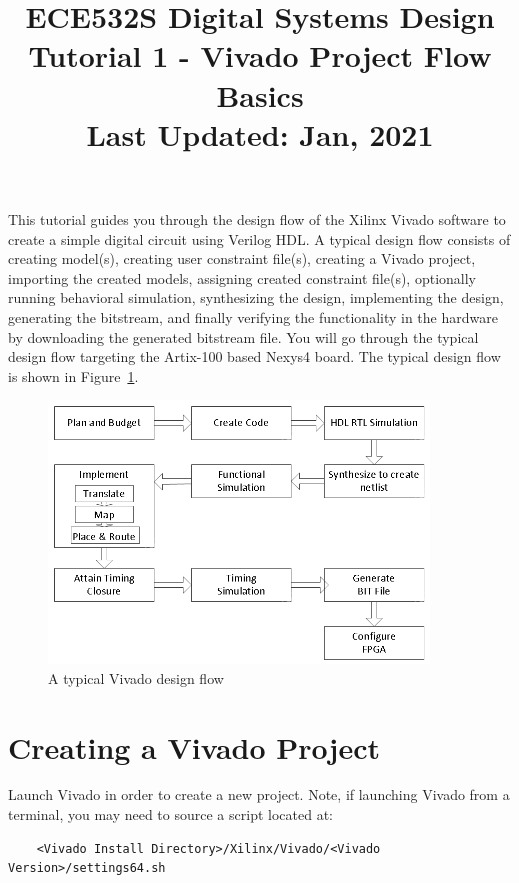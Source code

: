\documentclass[11pt]{article}
\title{ECE532S Digital Systems Design \\ \vspace{0.4cm}
       \Large Tutorial 1 - Vivado Project Flow Basics \\ \vspace{0.4cm}
       \small Last Updated: Jan, 2021}
\author{ }
\date{ }
\begin{document}
\maketitle
\vspace{-1cm}

This tutorial guides you through the design flow of the Xilinx Vivado software to create a simple digital circuit using Verilog HDL. A typical design flow consists of creating model(s), creating user constraint file(s), creating a Vivado project, importing the created models, assigning created constraint file(s), optionally running behavioral simulation, synthesizing the design, implementing the design, generating the bitstream, and finally verifying the functionality in the hardware by downloading the generated bitstream file. You will go through the typical design flow targeting the Artix-100 based Nexys4 board. The typical design flow is shown in Figure~\ref{fig:design_flow}.

\begin{figure}[!h]
    \centering
    \includegraphics[width=0.9\textwidth]{images/design_flow.png}
    \caption{A typical Vivado design flow}
    \label{fig:design_flow}
\end{figure}




\section{Creating a Vivado Project}
\label{sec:create_proj}
Launch Vivado in order to create a new project. Note, if launching Vivado from a terminal, you may need to source a script located at:

\begin{verbatim}
    <Vivado Install Directory>/Xilinx/Vivado/<Vivado Version>/settings64.sh
\end{verbatim}
\end{document}

